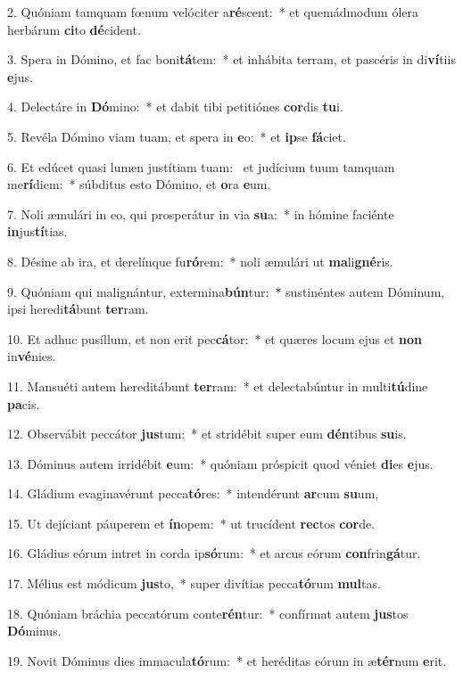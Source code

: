 2. Quóniam tamquam fœnum velóciter a\textbf{ré}scent:~*  et quemádmodum ólera herbárum \textbf{ci}to \textbf{dé}cident.\

3. Spera in Dómino, et fac boni\textbf{tá}tem:~*  et inhábita terram, et pascéris in di\textbf{ví}tiis \textbf{e}jus.\

4. Delectáre in \textbf{Dó}mino:~*  et dabit tibi petitiónes \textbf{cor}dis \textbf{tu}i.\

5. Revéla Dómino viam tuam, et spera in \textbf{e}o:~*  et \textbf{ip}se \textbf{fá}ciet.\

6. Et edúcet quasi lumen justítiam tuam: \dag\  et judícium tuum tamquam me\textbf{rí}diem:~*  súbditus esto Dómino, et \textbf{o}ra \textbf{e}um.\

7. Noli æmulári in eo, qui prosperátur in via \textbf{su}a:~*  in hómine faciénte \textbf{in}jus\textbf{tí}tias.\

8. Désine ab ira, et derelínque fu\textbf{ró}rem:~*  noli æmulári ut \textbf{ma}li\textbf{gné}ris.\

9. Quóniam qui malignántur, extermina\textbf{bún}tur:~*  sustinéntes autem Dóminum, ipsi heredi\textbf{tá}bunt \textbf{ter}ram.\

10. Et adhuc pusíllum, et non erit pec\textbf{cá}tor:~*  et quæres locum ejus et \textbf{non} in\textbf{vé}nies.\

11. Mansuéti autem hereditábunt \textbf{ter}ram:~*  et delectabúntur in multi\textbf{tú}dine \textbf{pa}cis.\

12. Observábit peccátor \textbf{jus}tum:~*  et stridébit super eum \textbf{dén}tibus \textbf{su}is.\

13. Dóminus autem irridébit \textbf{e}um:~*  quóniam próspicit quod véniet \textbf{di}es \textbf{e}jus.\

14. Gládium evaginavérunt pecca\textbf{tó}res:~*  intendérunt \textbf{ar}cum \textbf{su}um,\

15. Ut dejíciant páuperem et \textbf{ín}opem:~*  ut trucídent \textbf{rec}tos \textbf{cor}de.\

16. Gládius eórum intret in corda ip\textbf{só}rum:~*  et arcus eórum \textbf{con}frin\textbf{gá}tur.\

17. Mélius est módicum \textbf{jus}to,~*  super divítias pecca\textbf{tó}rum \textbf{mul}tas.\

18. Quóniam bráchia peccatórum conte\textbf{rén}tur:~*  confírmat autem \textbf{jus}tos \textbf{Dó}minus.\

19. Novit Dóminus dies immacula\textbf{tó}rum:~*  et heréditas eórum in æ\textbf{tér}num \textbf{e}rit.\

